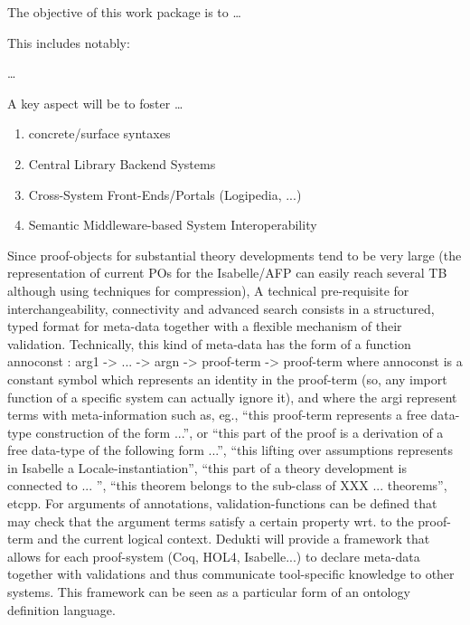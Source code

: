 \begin{workpackage}[id=structuring,wphases=0-48,
  short=Structured theories,%
  title=Structured theories,
  lead=FAU,
  FAURM=18]
  

\begin{wpobjectives}
  The objective of this work package is to \ldots

This includes notably:
  \begin{compactitem}
  \item \ldots
  \end{compactitem}
  A key aspect will be to foster \ldots
\end{wpobjectives}


\begin{wpdescription}

\begin{enumerate}
\item concrete/surface syntaxes 
\item Central Library Backend Systems 
\item Cross-System Front-Ends/Portals (Logipedia, ...)
\item Semantic Middleware-based System Interoperability
\end{enumerate} 

Since proof-objects for substantial theory developments tend to be
very large (the representation of current POs for the Isabelle/AFP can
easily reach several TB although using techniques for compression), A
technical pre-requisite for interchangeability, connectivity and
advanced search consists in a structured, typed format for meta-data
together with a flexible mechanism of their validation. Technically,
this kind of meta-data has the form of a function annoconst : arg1 ->
... -> argn -> proof-term -> proof-term where annoconst is a constant
symbol which represents an identity in the proof-term (so, any import
function of a specific system can actually ignore it), and where the
argi represent terms with meta-information such as, eg., “this
proof-term represents a free data-type construction of the form ...”,
or “this part of the proof is a derivation of a free data-type of the
following form ...”, “this lifting over assumptions represents in
Isabelle a Locale-instantiation”, “this part of a theory
development is connected to ... ”, “this theorem belongs to the
sub-class of XXX ... theorems”, etcpp. For arguments of annotations,
validation-functions can be defined that may check that the argument
terms satisfy a certain property wrt. to the proof-term and the
current logical context. Dedukti will provide a framework that allows
for each proof-system (Coq, HOL4, Isabelle...) to declare meta-data
together with validations and thus communicate tool-specific knowledge
to other systems. This framework can be seen as a particular form of
an ontology definition language.
 

\end{wpdescription}
\end{workpackage}
